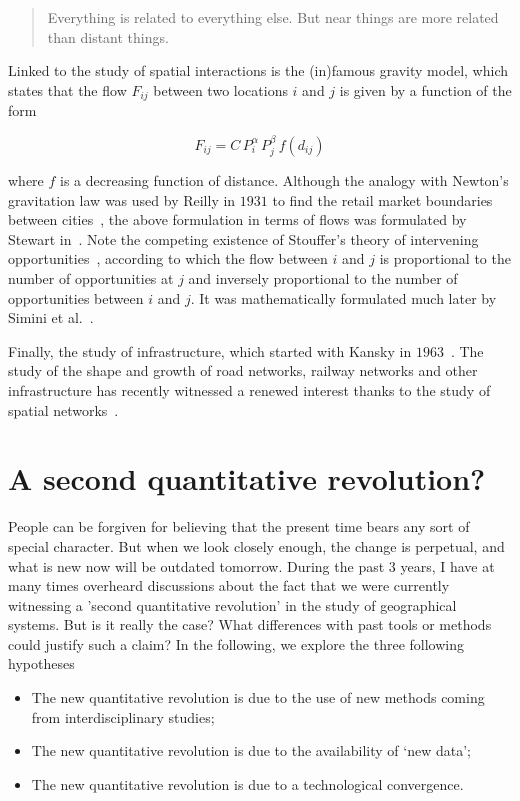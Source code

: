 \begin{quote}
    Everything is related to everything else. But near things
    are more related than distant things.
\end{quote}

Linked to the study of spatial interactions is the (in)famous gravity model,
which states that the flow $F_{ij}$ between two locations $i$ and $j$ is given
by a function of the form

\begin{equation}
    F_{ij} = C\, P_i^\alpha\,P_j^\beta\, f(d_{ij})
\end{equation}

where $f$ is a decreasing function of distance. Although the analogy with
Newton's gravitation law was used by Reilly in $1931$ to find the retail market
boundaries between cities~\cite{Reilly:1931}, the above formulation in terms of
flows was formulated by Stewart in~\cite{Stewart:1948}. Note the competing
existence of Stouffer's theory of intervening
opportunities~\cite{Stouffer:1940}, according to which the flow between $i$ and
$j$ is proportional to the number of opportunities at $j$ and inversely
proportional to the number of opportunities between $i$ and $j$. It was
mathematically formulated much later by Simini et al.~\cite{Simini:2012}.

Finally, the study of infrastructure, which started with Kansky in
$1963$~\cite{Kansky:1963}. The study of the shape and growth of road networks,
railway networks and other infrastructure has recently witnessed a renewed interest
thanks to the study of spatial networks~\cite{Barthelemy:2011}.


\section{A second quantitative revolution?}
\label{sec:a_second_quantitative_revolution_}

People can be forgiven for believing that the present time bears any sort of
special character. But when we look closely enough, the change is perpetual, and
what is new now will be outdated tomorrow. During the past $3$ years, I have
at many times overheard discussions about the fact that we were currently witnessing a 'second
quantitative revolution' in the study of geographical systems. But is it really
the case? What differences with past tools or methods could justify such a
claim? In the following, we explore the three following hypotheses

\begin{itemize}
    \item The new quantitative revolution is due to the use of new methods coming
        from interdisciplinary studies;
    \item The new quantitative revolution is due to the availability of `new data';
    \item The new quantitative revolution is due to a technological convergence.      
\end{itemize}



